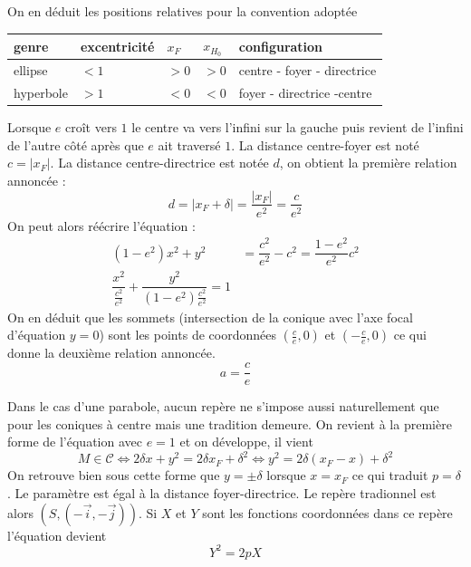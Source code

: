 On en déduit les positions relatives pour la convention adoptée
\begin{center}
\renewcommand{\arraystretch}{1.2}
\begin{tabular}{|l|l|l|l|l|}\hline
genre     & excentricité & $x_F$ & $x_{H_0}$ & configuration \\ \hline
ellipse   & $<1$         & $>0$  & $>0$      & centre - foyer - directrice\\ \hline
hyperbole & $>1$         & $<0$  & $<0$      & foyer - directrice -centre\\ \hline
\end{tabular}
\end{center}
Lorsque $e$ croît vers $1$ le centre va vers l'infini sur la gauche puis revient de l'infini de l'autre côté après que $e$ ait traversé $1$. La distance centre-foyer est noté $c=|x_F|$. La distance centre-directrice est notée $d$, on obtient la première relation annoncée :
\begin{displaymath}
 d = |x_F+\delta| = \dfrac{|x_F|}{e^2}=\dfrac{c}{e^2}
\end{displaymath}
On peut alors réécrire l'équation :
\begin{align*}
 (1-e^2)x^2 + y^2 &= \dfrac{c^2}{e^2}-c^2 = \dfrac{1-e^2}{e^2}c^2 \\
\dfrac{x^2}{\frac{c^2}{e^2}} + \dfrac{y^2}{(1-e^2)\frac{c^2}{e^2}} = 1
\end{align*}
On en déduit que les sommets (intersection de la conique avec l'axe focal d'équation $y=0$) sont les points de coordonnées $(\frac{c}{e},0)$ et $(-\frac{c}{e},0)$ ce qui donne la deuxième relation annoncée.
\begin{displaymath}
 a=\frac{c}{e}
\end{displaymath}

Dans le cas d'une parabole, aucun repère ne s'impose aussi naturellement que pour les coniques à centre mais une tradition demeure. On revient à la première forme de l'équation avec $e=1$ et on développe, il vient
\begin{displaymath}
 M\in \mathcal{C}\Leftrightarrow 2\delta x + y^2 = 2\delta x_F +\delta^2 \Leftrightarrow
y^2 = 2\delta(x_F - x) + \delta^2
\end{displaymath}
On retrouve bien sous cette forme que $y=\pm \delta$ lorsque $x=x_F$ ce qui traduit $p=\delta$. Le paramètre est égal à la distance foyer-directrice. Le repère tradionnel est alors $(S,(-\overrightarrow i,-\overrightarrow j))$. Si $X$ et $Y$ sont les fonctions coordonnées dans ce repère l'équation devient
\begin{displaymath}
 Y^2 = 2pX
\end{displaymath}


